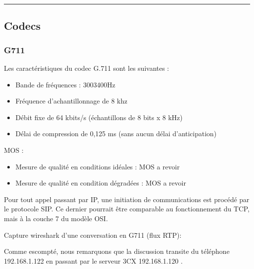 \documentclass[letterpaper,10pt,french]{sphinxmanual}
\begin{document}
\noindent{}


\bigskip\hrule\bigskip



\subsection{Codecs}
\label{\detokenize{Documentation-M362:codecs}}

\subsubsection{G711}
\label{\detokenize{Documentation-M362:g711}}
\sphinxAtStartPar
Les caractéristiques du codec G.711 sont les suivantes :
\begin{itemize}
\item {} 
\sphinxAtStartPar
Bande de fréquences : 300\sphinxhyphen{}3400Hz

\item {} 
\sphinxAtStartPar
Fréquence d’achantillonnage de 8 khz

\item {} 
\sphinxAtStartPar
Débit fixe de 64 kbits/s (échantillons de 8 bits x 8 kHz)

\item {} 
\sphinxAtStartPar
Délai de compression de 0,125 ms (sans aucun délai d’anticipation)

\end{itemize}

\sphinxAtStartPar
MOS :
\begin{itemize}
\item {} 
\sphinxAtStartPar
Mesure de qualité en conditions idéales : MOS a revoir

\item {} 
\sphinxAtStartPar
Mesure de qualité en condition dégradées : MOS a revoir

\end{itemize}

\sphinxAtStartPar
Pour tout appel passant par IP, une initiation de communications est procédé par le protocole SIP.
Ce dernier pourrait être comparable au fonctionnement du TCP, mais à la couche 7 du modèle OSI.

\sphinxAtStartPar
Capture wireshark d’une conversation en G711 (flux RTP):

\noindent{}

\sphinxAtStartPar
Comme escompté, nous remarquons que la discussion transite du téléphone 192.168.1.122 en passant par le serveur 3CX 192.168.1.120 .
\end{document}
